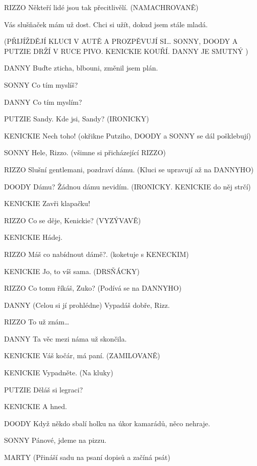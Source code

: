 RIZZO        Někteří lidé jsou tak přecitlivělí. (NAMACHROVANĚ) 

        Vás slušňaček mám už dost. Chci si užít, dokud jsem stále mladá.





(PŘIJÍŽDĚJÍ KLUCI V AUTĚ A PROZPĚVUJÍ SI… SONNY, DOODY A PUTZIE         DRŽÍ V RUCE PIVO. KENICKIE KOUŘÍ. DANNY JE SMUTNÝ )

DANNY        Buďte zticha, blbouni, změnil jsem plán.

SONNY        Co tím myslíš?

DANNY        Co tím myslím? 

PUTZIE        Sandy. Kde jsi, Sandy? (IRONICKY)

KENICKIE        Nech toho! (okřikne Putziho, DOODY a SONNY se dál pošklebují)

SONNY        Hele, Rizzo. (všimne si přicházející RIZZO)

RIZZO        Slušní gentlemani,  pozdraví dámu. (Kluci se upravují až na DANNYHO)

DOODY        Dámu? Žádnou dámu nevidím. (IRONICKY. KENICKIE do něj strčí) 

KENICKIE        Zavři klapačku!

RIZZO        Co se děje, Kenickie? (VYZÝVAVĚ) 

KENICKIE        Hádej.

RIZZO        Máš co nabídnout dámě?. (koketuje s KENECKIM) 

KENICKIE        Jo, to víš sama. (DRSŇÁCKY) 

RIZZO        Co tomu říkáš, Zuko? (Podívá se na DANNYHO)

DANNY        (Celou si jí prohlédne) Vypadáš dobře, Rizz.

RIZZO         To už znám…

DANNY        Ta věc mezi náma už skončila.  

KENICKIE        Váš kočár, má paní. (ZAMILOVANĚ) 

KENICKIE        Vypadněte. (Na kluky)

PUTZIE        Děláš si legraci?

KENICKIE        A hned.

DOODY        Když někdo sbalí holku na úkor kamarádů, něco nehraje. 

SONNY        Pánové, jdeme na pizzu.

        

MARTY        (Přináší sadu na psaní dopisů a začíná psát)

